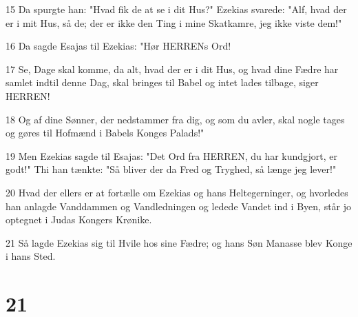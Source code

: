 \par 15 Da spurgte han: "Hvad fik de at se i dit Hus?" Ezekias svarede: "Alf, hvad der er i mit Hus, så de; der er ikke den Ting i mine Skatkamre, jeg ikke viste dem!"
\par 16 Da sagde Esajas til Ezekias: "Hør HERRENs Ord!
\par 17 Se, Dage skal komme, da alt, hvad der er i dit Hus, og hvad dine Fædre har samlet indtil denne Dag, skal bringes til Babel og intet lades tilbage, siger HERREN!
\par 18 Og af dine Sønner, der nedstammer fra dig, og som du avler, skal nogle tages og gøres til Hofmænd i Babels Konges Palads!"
\par 19 Men Ezekias sagde til Esajas: "Det Ord fra HERREN, du har kundgjort, er godt!" Thi han tænkte: "Så bliver der da Fred og Tryghed, så længe jeg lever!"
\par 20 Hvad der ellers er at fortælle om Ezekias og hans Heltegerninger, og hvorledes han anlagde Vanddammen og Vandledningen og ledede Vandet ind i Byen, står jo optegnet i Judas Kongers Krønike.
\par 21 Så lagde Ezekias sig til Hvile hos sine Fædre; og hans Søn Manasse blev Konge i hans Sted.

\chapter{21}

